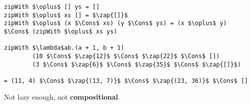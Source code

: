 \begin{frame}[t,fragile]
\vspace{35pt}


\begin{lstlisting}[mathescape=true,numbers=none]
zipWith $\oplus$ [] ys = []
zipWith $\oplus$ xs [] = $\zap{[]}$
zipWith $\oplus$ (x $\Cons$ xs) (y $\Cons$ ys) = (x $\oplus$ y) $\Cons$ (zipWith $\oplus$ xs ys)

zipWith $\lambda$ab.(a + 1, b + 1)
        (10 $\Cons$ $\zap{12}$ $\Cons$ $\zap{22}$ $\Cons$ [])
        (3 $\Cons$ $\zap{6}$ $\Cons$ $\zap{35}$ $\Cons$ $\zap{[]}$)

= (11, 4) $\Cons$ $\zap{(13, 7)}$ $\Cons$ $\zap{(23, 36)}$ $\Cons$ []
\end{lstlisting}

\vspace{5pt}
Not lazy enough, not \textbf{compositional}.

\end{frame}
